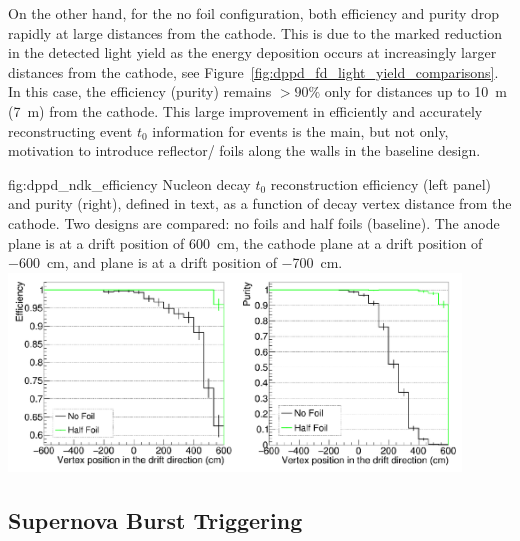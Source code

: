 On the other hand, for the no foil configuration, both efficiency and purity drop rapidly at large distances from the cathode. This is due to the marked reduction in the detected  light yield as the energy deposition occurs at increasingly larger distances from the cathode, see Figure~\ref{fig:dppd_fd_light_yield_comparisons}. In this case, the efficiency (purity) remains $>90\%$ only for distances up to \SI{10}{\m} (\SI{7}{\m}) from the cathode. This large improvement in efficiently and accurately reconstructing event $t_0$ information for  events is the main, but not only, motivation to introduce reflector/ foils along the  walls in the baseline design.

\begin{dunefigure}{fig:dppd_ndk_efficiency}
     {Nucleon decay $t_0$ reconstruction efficiency (left panel) and purity (right), defined in text, as a function of decay vertex distance from the cathode. Two  designs are compared: no foils and half foils (baseline). The anode plane is at a drift position of \SI{+600}{\cm}, the cathode plane at a drift position of \SI{-600}{\cm},  and  plane is at a drift position of \SI{-700}{\cm}.}
    \includegraphics[width=0.90\textwidth]{graphics/dppd_ndk_efficiency.pdf}
    \end{dunefigure}


\subsection{Supernova Burst Triggering}
\label{subsec:dp-pds-performance_trigger}

